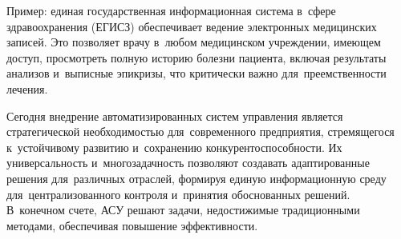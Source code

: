 \documentclass{ou}
\begin{document}
Пример: единая государственная информационная система в~сфере здравоохранения (ЕГИСЗ) обеспечивает ведение электронных медицинских записей. Это позволяет врачу в~любом медицинском учреждении, имеющем доступ, просмотреть полную историю болезни пациента, включая результаты анализов и~выписные эпикризы, что критически важно для~преемственности лечения.

Сегодня внедрение автоматизированных систем управления является стратегической необходимостью для~современного предприятия, стремящегося к~устойчивому развитию и~сохранению конкурентоспособности. Их универсальность и~многозадачность позволяют создавать адаптированные решения для~различных отраслей, формируя единую информационную среду для~централизованного контроля и~принятия обоснованных решений. В~конечном счете, АСУ решают задачи, недостижимые традиционными методами, обеспечивая повышение эффективности.
\newpage
{
\sloppy
\nocite{*}
\cleardoublepage
{}


}
\end{document}
